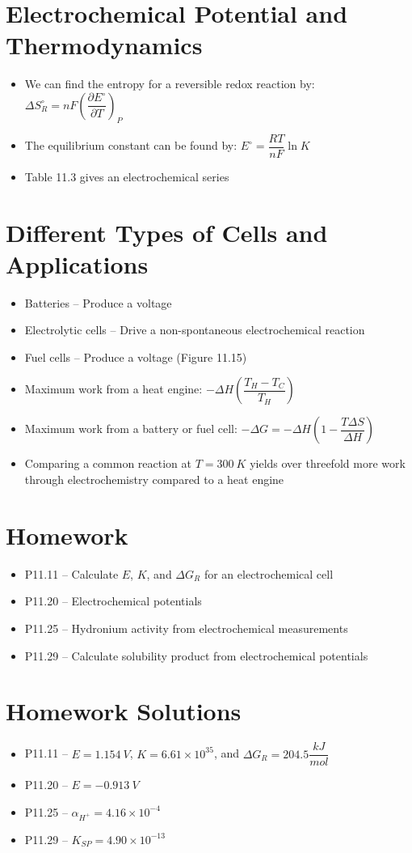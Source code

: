 \documentclass[12pt, openany, letterpaper]{memoir}
\begin{document}
\section*{Electrochemical Potential and Thermodynamics}
\begin{itemize}
	\item We can find the entropy for a reversible redox reaction by: $\Delta S^\circ_R = nF\left(\dfrac{\partial E^\circ}{\partial T}\right)_P$
	\item The equilibrium constant can be found by: $E^\circ = \dfrac{RT}{nF}\ln K$
	\item Table 11.3 gives an electrochemical series
\end{itemize}
\section*{Different Types of Cells and Applications}
\begin{itemize}
	\item Batteries -- Produce a voltage
	\item Electrolytic cells -- Drive a non-spontaneous electrochemical reaction
	\item Fuel cells -- Produce a voltage (Figure 11.15)
	\item Maximum work from a heat engine: $-\Delta H\left(\dfrac{T_H-T_C}{T_H}\right)$
	\item Maximum work from a battery or fuel cell: $-\Delta G = -\Delta H\left(1-\dfrac{T\Delta S}{\Delta H}\right)$
	\item Comparing a common reaction at $T=300~K$ yields over threefold more work through electrochemistry compared to a heat engine
\end{itemize}
\section*{Homework}
\begin{itemize}
	\item P11.11 -- Calculate $E$, $K$, and $\Delta G_R$ for an electrochemical cell
	\item P11.20 -- Electrochemical potentials
	\item P11.25 -- Hydronium activity from electrochemical measurements
	\item P11.29 -- Calculate solubility product from electrochemical potentials
\end{itemize}
\section*{Homework Solutions}
\begin{itemize}
	\item P11.11 -- $E = 1.154~V$,  $K = 6.61\times10^{35}$, and $\Delta G_R = 204.5\dfrac{kJ}{mol}$
	\item P11.20 -- $E = -0.913~V$
	\item P11.25 -- $\alpha_{H^+} = 4.16\times10^{-4}$
	\item P11.29 -- $K_{SP} = 4.90\times10^{-13}$
\end{itemize}
\end{document}
